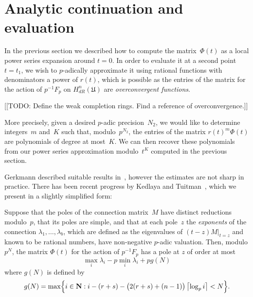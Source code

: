 \section{Analytic continuation and evaluation}

In the previous section we described how to compute the matrix~$\Phi(t)$ as 
a local power series expansion around $t = 0$.  In order to evaluate it 
at a second point $t = t_1$, we wish to $p$-adically approximate it 
using rational functions with denominators a power of $r(t)$, which 
is possible as the entries of the matrix for the action of $p^{-1} F_p$ 
on $H_{dR}^{n}(\mathfrak{U})$ are \emph{overconvergent functions}.

[[TODO:  Define the weak completion rings.  Find a reference of 
overconvergence.]]

More precisely, given a desired $p$-adic precision~$N_2$, we would 
like to determine integers~$m$ and~$K$ such that, modulo~$p^{N_2}$, 
the entries of the matrix $r(t)^m \Phi(t)$ are polynomials of degree 
at most~$K$.  We can then recover these polynomials from our power 
series approximation modulo~$t^K$ computed in the previous section.

Gerkmann described suitable results in~\citep[\S 6]{Gerkmann2007}, 
however the estimates are not sharp in practice.  There has been recent 
progress by Kedlaya and Tuitman~\citep[Theorem~2.1]{KedlayaTuitman2012}, 
which we present in a slightly simplified form:

\begin{thm} \label{thm:KedlayaTuitman}
Suppose that the poles of the connection matrix~$M$ have distinct 
reductions modulo~$p$, that its poles are simple, and that at each 
pole~$z$ the \emph{exponents} of the connection $\lambda_1, \dotsc, \lambda_b$,
which are defined as the eigenvalues of $(t-z) M \vert_{t=z}$ and known to be 
rational numbers, have non-negative $p$-adic valuation.  Then, modulo $p^N$, 
the matrix $\Phi(t)$ for the action of $p^{-1} F_p$ has a pole at $z$ of order 
at most 
\begin{equation} \label{eq:KedlayaTuitman}
\max_{i} \lambda_i - p \min_{i} \lambda_i + p g(N)
\end{equation}
where $g(N)$ is defined by 
\begin{equation}
g(N) = \max\Bigl\{ i \in \mathbf{N} : i - (r+s) - \bigl(2(r+s) + (n-1)\bigr) \left\lceil\log_p i\right\rceil < N \Bigr\}.
\end{equation}
\end{thm}

